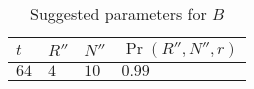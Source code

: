 \begin{table}[]
\centering
\caption{Suggested parameters for $B$}
\label{table:suggested_parameters:B}
\begin{tabular}{|l|l|l|l|}
\hline
$t$ & $R''$ & $N''$ & $\Pr(R'',N'',r)$ \\ \hline
$64$ & $4$ & $10$ & $0.99$ \\ \hline
\end{tabular}
\end{table}











